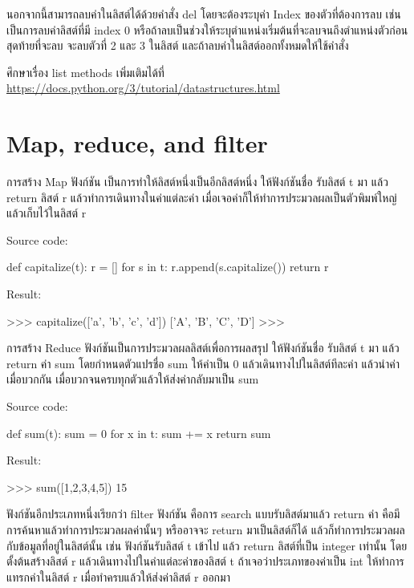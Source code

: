 นอกจากนี้สามารถลบค่าในลิสต์ได้ด้วยคำสั่ง del โดยจะต้องระบุค่า Index ของตัวที่ต้องการลบ เช่น   เป็นการลบค่าลิสต์ที่มี index 0 หรือถ้าลบเป็นช่วงให้ระบุตำแหน่งเริ่มต้นที่จะลบจนถึงตำแหน่งตัวก่อนสุดท้ายที่จะลบ   จะลบตัวที่ 2 และ 3 ในลิสต์ และถ้าลบค่าในลิสต์ออกทั้งหมดให้ใช้คำสั่ง  

ศึกษาเรื่อง list methods เพิ่มเติมได้ที่ \url{https://docs.python.org/3/tutorial/datastructures.html}

\section{Map, reduce, and filter}

การสร้าง Map ฟังก์ชัน เป็นการทำให้ลิสต์หนึ่งเป็นอีกลิสต์หนึ่ง ให้ฟังก์ชันชื่อ   รับลิสต์ t มา แล้ว return ลิสต์ r แล้วทำการเดินทางในค่าแต่ละค่า เมื่อเจอค่าก็ให้ทำการประมวลผลเป็นตัวพิมพ์ใหญ่ แล้วเก็บไว้ในลิสต์ r

Source code:
\begin{pycode}
def capitalize(t):
    r = []
    for s in t:
        r.append(s.capitalize())
    return r
\end{pycode}

Result:
\begin{pycode}
>>> capitalize(['a', 'b', 'c', 'd'])
['A', 'B', 'C', 'D']
>>>
\end{pycode}



การสร้าง Reduce ฟังก์ชันเป็นการประมวลผลลิสต์เพื่อการผลสรุป ให้ฟังก์ชันชื่อ   รับลิสต์ t มา แล้ว return ค่า sum โดยกำหนดตัวแปรชื่อ sum ให้ค่าเป็น 0 แล้วเดินทางไปในลิสต์ทีละค่า แล้วนำค่าเมื่อบวกกัน เมื่อบวกจนครบทุกตัวแล้วให้ส่งค่ากลับมาเป็น sum

Source code:
\begin{pycode}
def sum(t):
    sum = 0
    for x in t: sum += x
    return sum
\end{pycode}

Result:
\begin{pycode}
>>> sum([1,2,3,4,5])
15
\end{pycode}


ฟังก์ชันอีกประเภทหนึ่งเรียกว่า filter ฟังก์ชัน คือการ search แบบรับลิสต์มาแล้ว return ค่า คือมีการค้นหาแล้วทำการประมวลผลค่านั้นๆ หรืออาจจะ return มาเป็นลิสต์ก็ได้ แล้วก็ทำการประมวลผลกับข้อมูลที่อยู่ในลิสต์นั้น เช่น ฟังก์ชันรับลิสต์ t เข้าไป แล้ว return ลิสต์ที่เป็น integer เท่านั้น โดยตั้งต้นสร้างลิสต์ r แล้วเดินทางไปในค่าแต่ละค่าของลิสต์ t ถ้าเจอว่าประเภทของค่าเป็น int ให้ทำการแทรกค่าในลิสต์ r เมื่อทำครบแล้วให้ส่งค่าลิสต์ r ออกมา

